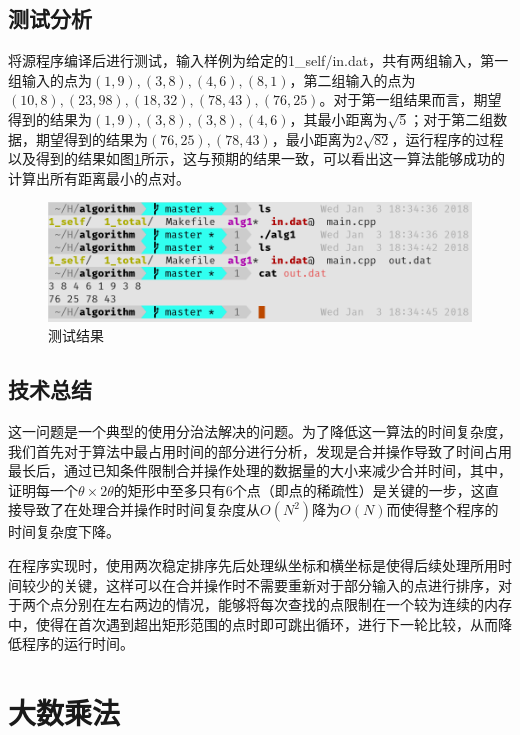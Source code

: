 \documentclass{report}
\begin{document}
\section{测试分析}
\label{sec:ce_shi_fen_xi_1}
将源程序编译后进行测试，输入样例为给定的1\_self/in.dat，共有两组输入，第一组输入的点为$(1, 9), (3, 8), (4, 6), (8, 1)$，第二组输入的点为$(10, 8), (23, 98), (18, 32), (78, 43), (76, 25)$。对于第一组结果而言，期望得到的结果为${(1, 9), (3, 8), (3, 8), (4, 6)}$，其最小距离为$\sqrt{5}$；对于第二组数据，期望得到的结果为${(76, 25), (78, 43)}$，最小距离为$2\sqrt{82}$，运行程序的过程以及得到的结果如图\ref{fig:result1}所示，这与预期的结果一致，可以看出这一算法能够成功的计算出所有距离最小的点对。
\begin{figure}[ht]
    \centering
    \includegraphics[width=0.8\linewidth]{result1.png}
    \caption{测试结果}
    \label{fig:result1}
\end{figure}

\section{技术总结}
\label{sec:ji_zhu_zong_jie_1}
这一问题是一个典型的使用分治法解决的问题。为了降低这一算法的时间复杂度，我们首先对于算法中最占用时间的部分进行分析，发现是合并操作导致了时间占用最长后，通过已知条件限制合并操作处理的数据量的大小来减少合并时间，其中，证明每一个$\theta \times 2\theta$的矩形中至多只有6个点（即点的稀疏性）是关键的一步，这直接导致了在处理合并操作时时间复杂度从$O(N^2)$降为$O(N)$而使得整个程序的时间复杂度下降。\par

在程序实现时，使用两次稳定排序先后处理纵坐标和横坐标是使得后续处理所用时间较少的关键，这样可以在合并操作时不需要重新对于部分输入的点进行排序，对于两个点分别在左右两边的情况，能够将每次查找的点限制在一个较为连续的内存中，使得在首次遇到超出矩形范围的点时即可跳出循环，进行下一轮比较，从而降低程序的运行时间。\par

\chapter{大数乘法}
\label{cha:da_shu_cheng_fa_}
\end{document}
